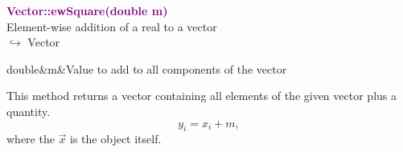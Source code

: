 \textcolor{purple}{\textbf{Vector::ewSquare(double m)}}\label{Vector::ewSquare(double m)}\\
Element-wise addition of a real to a vector\\ \hspace*{10mm}$\hookrightarrow$ Vector

\begin{tcolorbox}[width=\textwidth,myArgs,tabularx={ll|R}]
double&m&Value to add to all components of the vector
\end{tcolorbox}

This method returns a vector containing all elements of the given vector plus a quantity.
\begin{equation*}
y_i = x_i + m,
\end{equation*}
where the $\overrightarrow{x}$ is the object itself.


